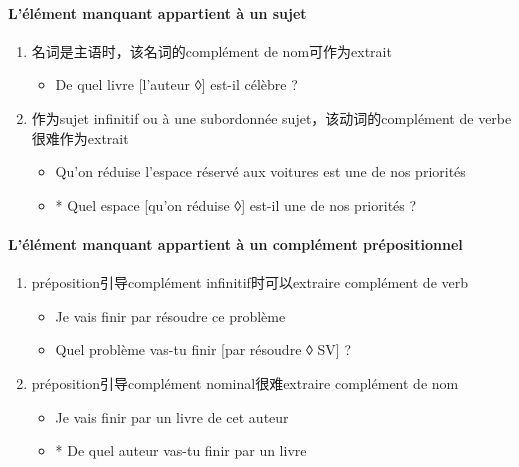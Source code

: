 \documentclass[UTF8]{report}
\begin{document}
\paragraph{L’élément manquant appartient à un sujet}
\begin{enumerate}
    \item 名词是主语时，该名词的complément de nom可作为extrait
    \begin{itemize}
        \item  De quel livre [l’auteur ◊] est-il célèbre ?
    \end{itemize}
    \item 作为sujet infinitif ou à une subordonnée sujet，该动词的complément de verbe很难作为extrait
    \begin{itemize}
        \item Qu’on réduise l’espace réservé aux voitures est une de nos priorités
        \item * Quel espace [qu’on réduise ◊] est-il une de nos priorités ?
    \end{itemize}
\end{enumerate}
\paragraph{L’élément manquant appartient à un complément prépositionnel}
\begin{enumerate}
    \item préposition引导complément infinitif时可以extraire complément de verb
    \begin{itemize}
        \item Je vais finir par résoudre ce problème 
        \item Quel problème vas-tu finir [par résoudre ◊ SV] ?
    \end{itemize}
    \item préposition引导complément nominal很难extraire complément de nom
    \begin{itemize}
        \item Je vais finir par un livre de cet auteur
        \item * De quel auteur vas-tu finir par un livre
    \end{itemize}
\end{enumerate}
\end{document}
